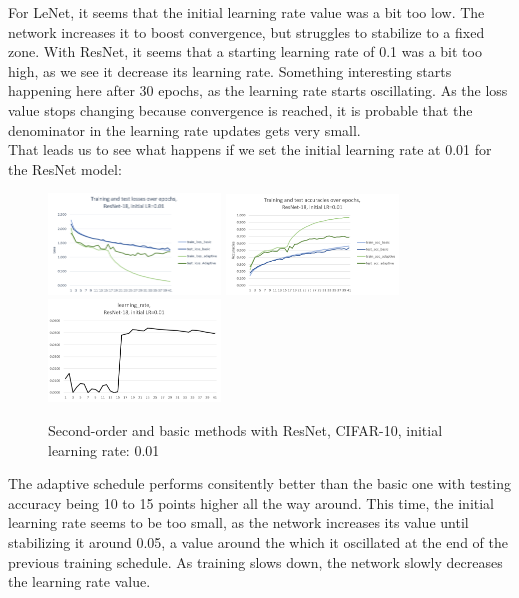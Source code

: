 \documentclass{article}
\begin{document}
  For LeNet, it seems that the initial learning rate value was a bit too low. The network increases it to boost convergence, but struggles to stabilize to a fixed zone. With ResNet, it seems that a starting learning rate of 0.1 was a bit too high, as we see it decrease its learning rate. Something interesting starts happening here after 30 epochs, as the learning rate starts oscillating. As the loss value stops changing because convergence is reached, it is probable that the denominator in the learning rate updates gets very small.\\
  
  That leads us to see what happens if we set the initial learning rate at 0.01 for the ResNet model:\\
  
  \begin{figure}[!h]
	\includegraphics[width=130pt]{loss_resnet_0_01.png}
	\includegraphics[width=130pt]{acc_resnet_0_01.png}
	\includegraphics[width=130pt]{lr_resnet_0_01.png}
	\caption{Second-order and basic methods with ResNet, CIFAR-10, initial learning rate: 0.01}
  \end{figure}
  
  The adaptive schedule performs consitently better than the basic one with testing accuracy being 10 to 15 points higher all the way around. This time, the initial learning rate seems to be too small, as the network increases its value until stabilizing it around 0.05, a value around the which it oscillated at the end of the previous training schedule. As training slows down, the network slowly decreases the learning rate value.\\
  
\end{document}
